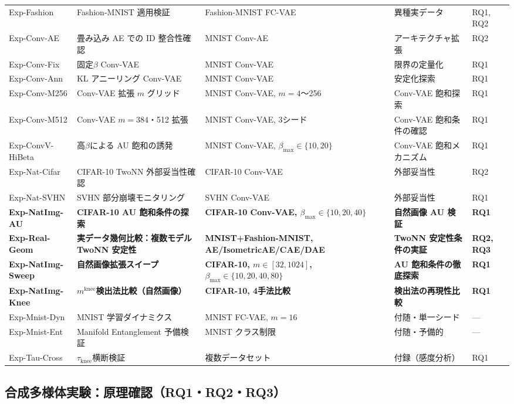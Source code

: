 \documentclass[11pt,a4paper]{jsarticle}
\newcommand{\mknee}{m^{\mathrm{knee}}}
\begin{document}
\begin{table}[H]
\begin{tabular}{lllll}
Exp-Fashion & Fashion-MNIST 適用検証 & Fashion-MNIST FC-VAE & 異種実データ & RQ1, RQ2 \\
Exp-Conv-AE & 畳み込み AE での ID 整合性確認 & MNIST Conv-AE & アーキテクチャ拡張 & RQ2 \\
Exp-Conv-Fix & 固定$\beta$ Conv-VAE & MNIST Conv-VAE & 限界の定量化 & RQ1 \\
Exp-Conv-Ann & KL アニーリング Conv-VAE & MNIST Conv-VAE & 安定化探索 & RQ1 \\
Exp-Conv-M256 & Conv-VAE 拡張 $m$ グリッド & MNIST Conv-VAE, $m=4$〜256 & Conv-VAE 飽和探索 & RQ1 \\
Exp-Conv-M512 & Conv-VAE $m=384$・512 拡張 & MNIST Conv-VAE, 3シード & Conv-VAE 飽和条件の確認 & RQ1 \\
Exp-ConvV-HiBeta & 高$\beta$による AU 飽和の誘発 & MNIST Conv-VAE, $\beta_{\max}\in\{10,20\}$ & Conv-VAE 飽和メカニズム & RQ1 \\
Exp-Nat-Cifar & CIFAR-10 TwoNN 外部妥当性確認 & CIFAR-10 Conv-VAE & 外部妥当性 & RQ2 \\
Exp-Nat-SVHN & SVHN 部分崩壊モニタリング & SVHN Conv-VAE & 外部妥当性 & RQ1 \\
\textbf{Exp-NatImg-AU} & \textbf{CIFAR-10 AU 飽和条件の探索} & \textbf{CIFAR-10 Conv-VAE, $\beta_{\max}\in\{10,20,40\}$} & \textbf{自然画像 AU 検証} & \textbf{RQ1} \\
\textbf{Exp-Real-Geom} & \textbf{実データ幾何比較：複数モデル TwoNN 安定性} & \textbf{MNIST+Fashion-MNIST, AE/IsometricAE/CAE/DAE} & \textbf{TwoNN 安定性条件の実証} & \textbf{RQ2, RQ3} \\
\textbf{Exp-NatImg-Sweep} & \textbf{自然画像拡張スイープ} & \textbf{CIFAR-10, $m\in[32,1024]$, $\beta_{\max}\in\{10,20,40,80\}$} & \textbf{AU 飽和条件の徹底探索} & \textbf{RQ1} \\
\textbf{Exp-NatImg-Knee} & \textbf{$\mknee$検出法比較（自然画像）} & \textbf{CIFAR-10, 4手法比較} & \textbf{検出法の再現性比較} & \textbf{RQ1} \\
Exp-Mnist-Dyn & MNIST 学習ダイナミクス & MNIST FC-VAE, $m=16$ & 付随・単一シード & --- \\
Exp-Mnist-Ent & Manifold Entanglement 予備検証 & MNIST クラス制限 & 付随・予備的 & --- \\
Exp-Tau-Cross & $\tau_\mathrm{knee}$横断検証 & 複数データセット & 付録（感度分析） & RQ1 \\
\bottomrule
\end{tabular}
\end{table}

\subsection{合成多様体実験：原理確認（RQ1・RQ2・RQ3）}\label{sec:exp_synthetic}
\end{document}
